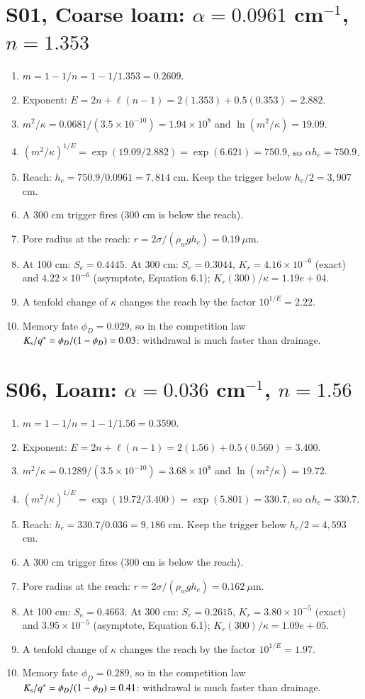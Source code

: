 \section{S01, Coarse loam: $\alpha=0.0961$ cm$^{-1}$, $n=1.353$}
\begin{enumerate}[leftmargin=*,itemsep=1pt]
\item $m=1-1/n=1-1/1.353=0.2609$.
\item Exponent: $E=2n+\ell(n-1)=2(1.353)+0.5(0.353)=2.882$.
\item $m^2/\kappa=0.0681/(3.5\times10^{-10})=1.94\times10^{8}$ and $\ln(m^2/\kappa)=19.09$.
\item $(m^2/\kappa)^{1/E}=\exp(19.09/2.882)=\exp(6.621)=750.9$, so $\alpha h_c=750.9$.
\item Reach: $h_c=750.9/0.0961=7,814$ cm. Keep the trigger below $h_c/2=3,907$ cm.
\item A 300 cm trigger fires (300 cm is below the reach).
\item Pore radius at the reach: $r=2\sigma/(\rho_wgh_c)=0.19\ \mu$m.
\item At 100 cm: $S_e=0.4445$. At 300 cm: $S_e=0.3044$, $K_r=4.16\times10^{-6}$ (exact) and $4.22\times10^{-6}$ (asymptote, Equation 6.1); $K_r(300)/\kappa=1.19e+04$.
\item A tenfold change of $\kappa$ changes the reach by the factor $10^{1/E}=2.22$.
\item Memory fate $\phi_D=0.029$, so in the competition law $K_{\mathrm s}/q^*=\phi_D/(1-\phi_D)=0.03$: withdrawal is much faster than drainage.
\end{enumerate}
\section{S06, Loam: $\alpha=0.036$ cm$^{-1}$, $n=1.56$}
\begin{enumerate}[leftmargin=*,itemsep=1pt]
\item $m=1-1/n=1-1/1.56=0.3590$.
\item Exponent: $E=2n+\ell(n-1)=2(1.56)+0.5(0.560)=3.400$.
\item $m^2/\kappa=0.1289/(3.5\times10^{-10})=3.68\times10^{8}$ and $\ln(m^2/\kappa)=19.72$.
\item $(m^2/\kappa)^{1/E}=\exp(19.72/3.400)=\exp(5.801)=330.7$, so $\alpha h_c=330.7$.
\item Reach: $h_c=330.7/0.036=9,186$ cm. Keep the trigger below $h_c/2=4,593$ cm.
\item A 300 cm trigger fires (300 cm is below the reach).
\item Pore radius at the reach: $r=2\sigma/(\rho_wgh_c)=0.162\ \mu$m.
\item At 100 cm: $S_e=0.4663$. At 300 cm: $S_e=0.2615$, $K_r=3.80\times10^{-5}$ (exact) and $3.95\times10^{-5}$ (asymptote, Equation 6.1); $K_r(300)/\kappa=1.09e+05$.
\item A tenfold change of $\kappa$ changes the reach by the factor $10^{1/E}=1.97$.
\item Memory fate $\phi_D=0.289$, so in the competition law $K_{\mathrm s}/q^*=\phi_D/(1-\phi_D)=0.41$: withdrawal is much faster than drainage.
\end{enumerate}
